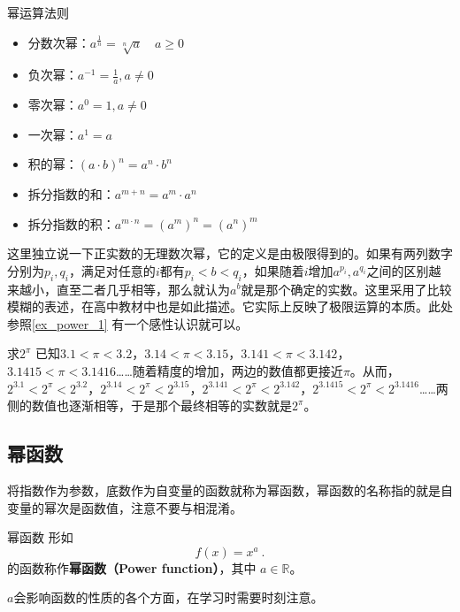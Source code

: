 \begin{theorem}{幂运算法则}\label{the_power_1}
\begin{itemize}
\item 分数次幂：$a^{\frac{1}{n}} = \sqrt[n]{a} \quad a \geq 0$
\item 负次幂：$\displaystyle a^{-1}=\frac{1}{a},a\neq0$
\item 零次幂：$a^0=1,a\neq0$
\item 一次幂：$a^1=a$
\item 积的幂：$(a \cdot b)^n = a^n \cdot b^n$
\item 拆分指数的和：$a^{m+n}=a^m \cdot a^n$
\item 拆分指数的积：$a^{m \cdot n}= (a^m)^n =(a^n)^m $
\end{itemize}
\end{theorem}

这里独立说一下正实数的无理数次幂，它的定义是由极限得到的。如果有两列数字分别为$p_i,q_i$，满足对任意的$i$都有$p_i<b<q_i$，如果随着$i$增加$a^{p_i},a^{q_i}$之间的区别越来越小，直至二者几乎相等，那么就认为$a^b$就是那个确定的实数。这里采用了比较模糊的表述，在高中教材中也是如此描述。它实际上反映了极限运算的本质。此处参照\autoref{ex_power_1} 有一个感性认识就可以。

\begin{example}{求$2^\pi$}\label{ex_power_1}
已知$3.1<\pi<3.2$，$3.14<\pi<3.15$，$3.141<\pi<3.142$，$3.1415<\pi<3.1416$……随着精度的增加，两边的数值都更接近$\pi$。从而，$2^{3.1}<2^\pi<2^{3.2}$，$2^{3.14}<2^\pi<2^{3.15}$，$2^{3.141}<2^\pi<2^{3.142}$，$2^{3.1415}<2^\pi<2^{3.1416}$……两侧的数值也逐渐相等，于是那个最终相等的实数就是$2^\pi$。
\end{example}

\subsection{幂函数}

将指数作为参数，底数作为自变量的函数就称为幂函数，幂函数的名称指的就是自变量的幂次是函数值，注意不要与相混淆。

\begin{definition}{幂函数}
形如
\begin{equation}
f(x) = x^a~.
\end{equation}
的函数称作\textbf{幂函数（Power function）}，其中 $a\in\mathbb R$。
\end{definition}

$a$会影响函数的性质的各个方面，在学习时需要时刻注意。


